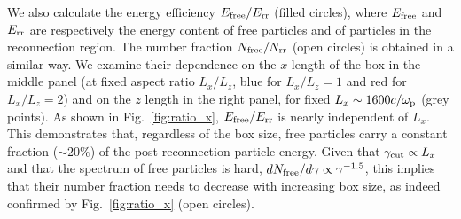 \documentclass[twocolumn,twocolappendix]{aastex63}
\newcommand{\ls}{\textcolor{teal}}
\newcommand{\hz}{\textcolor{orange}}
\newcommand{\comp}{c/\omega_{\rm p}}
\begin{document}

We also calculate the energy efficiency $E_{\rm free}/E_{\rm rr}$ (filled circles), where $E_{\rm free}$ and $E_{\rm rr}$ are respectively the energy content of free particles and of particles in the reconnection region. The number fraction $N_{\rm free}/N_{\rm rr}$ (open circles) is obtained in a similar way. We examine their dependence on the $x$ length of the box in the middle panel (at fixed aspect ratio $L_x/L_z$, blue for $L_x/L_z=1$ and red for $L_x/L_z=2$) and on the $z$ length in the right panel, for fixed $L_x\sim 1600\comp$ (grey points).
As shown in Fig.~\ref{fig:ratio_x}, $E_{\rm free}/E_{\rm rr}$ is nearly independent of $L_x$. This demonstrates that, regardless of the box size, free particles carry a constant fraction ($\sim 20\%$) of the post-reconnection particle energy. Given that $\gamma_{\rm cut}\propto L_x$ and that the spectrum of free particles is hard, $dN_{\rm free}/d\gamma\propto \gamma^{-1.5}$, this implies that their number fraction needs to decrease with increasing box size, as indeed confirmed by Fig.~\ref{fig:ratio_x} (open circles).
\end{document}
